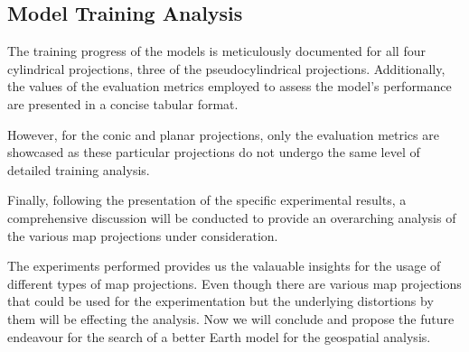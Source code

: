 \subsection{Model Training Analysis}
The training progress of the models is meticulously documented for all four cylindrical projections, three of the pseudocylindrical projections.
Additionally, the values of the evaluation metrics employed to assess the model's performance are presented in a concise tabular format.

However, for the conic and planar projections, only the evaluation metrics are showcased as these particular projections do not undergo the same level of detailed training
analysis.

Finally, following the presentation of the specific experimental results, a comprehensive discussion will be conducted to provide an overarching analysis of the
various map projections under consideration.

\clearpage

\clearpage

\clearpage


\clearpage



The experiments performed provides us the valauable insights for the usage of different types of map projections. Even though there are various map projections that could be used for the experimentation but the underlying
distortions by them will be effecting the analysis. Now we will conclude and propose the future endeavour for the search of a better Earth model for the geospatial analysis.